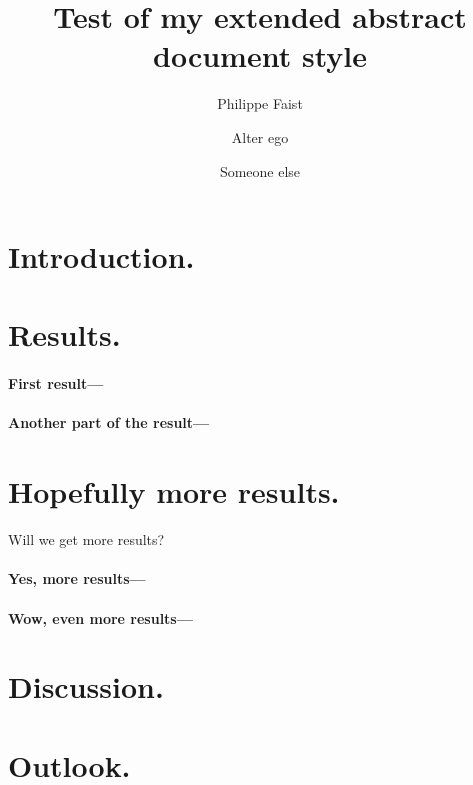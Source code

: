 \documentclass[
    sansstyle=false,
]{phfextendedabstract}
\begin{document}
\title{Test of my extended abstract document style}
\author{Philippe Faist}
\author{Alter ego}
\author{Someone else}
\maketitle


\section{Introduction.}
\lipsum[1]

\section{Results.}
\lipsum[2]

\paragraph{First result---}
\lipsum[3]

\paragraph{Another part of the result---}
\lipsum[4-5]

\section{Hopefully more results.}
Will we get more results?

\paragraph{Yes, more results---}
\lipsum[6]

\paragraph{Wow, even more results---}
\lipsum[7]

\section{Discussion.}
\lipsum[8]

\section{Outlook.}
\lipsum[9]
\end{document}
